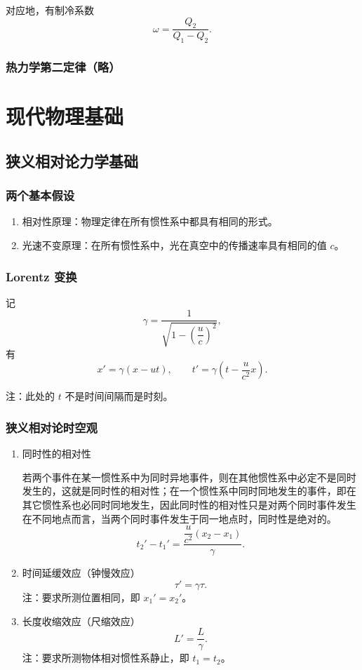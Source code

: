 \documentclass[UTF8,fontset=fandol,zihao=5]{ctexart}
\begin{document}
对应地，有制冷系数
\[
  \omega=\frac{Q_2}{Q_1-Q_2}.
\]

\subsubsection{热力学第二定律（略）}

\section{现代物理基础}

\subsection{狭义相对论力学基础}

\subsubsection{两个基本假设}

\begin{enumerate}
  \item 相对性原理：物理定律在所有惯性系中都具有相同的形式。
  \item 光速不变原理：在所有惯性系中，光在真空中的传播速率具有相同的值 \(c\)。
\end{enumerate}

\subsubsection{Lorentz 变换}

记
\[
  \gamma=\frac{1}{\sqrt{1-\left(\dfrac uc\right)^2}},
\]
有
\[
  x'=\gamma(x-ut),
  \qquad
  t'=\gamma\left(t-\frac{u}{c^2}x\right).
\]

注：此处的 \(t\) 不是时间间隔而是时刻。

\subsubsection{狭义相对论时空观}

\begin{enumerate}
  \item 同时性的相对性

  若两个事件在某一惯性系中为同时异地事件，则在其他惯性系中必定不是同时发生的，这就是同时性的相对性；在一个惯性系中同时同地发生的事件，即在其它惯性系也必同时同地发生，因此同时性的相对性只是对两个同时事件发生在不同地点而言，当两个同时事件发生于同一地点时，同时性是绝对的。
  \[
    t_2'-t_1'=\frac{\dfrac{u}{c^2}(x_2-x_1)}{\gamma}.
  \]

  \item 时间延缓效应（钟慢效应）
  \[
    \tau'=\gamma\tau.
  \]
  注：要求所测位置相同，即 \(x_1'=x_2'\)。

  \item 长度收缩效应（尺缩效应）
  \[
    L'=\frac L\gamma.
  \]
  注：要求所测物体相对惯性系静止，即 \(t_1=t_2\)。
\end{enumerate}
\end{document}
